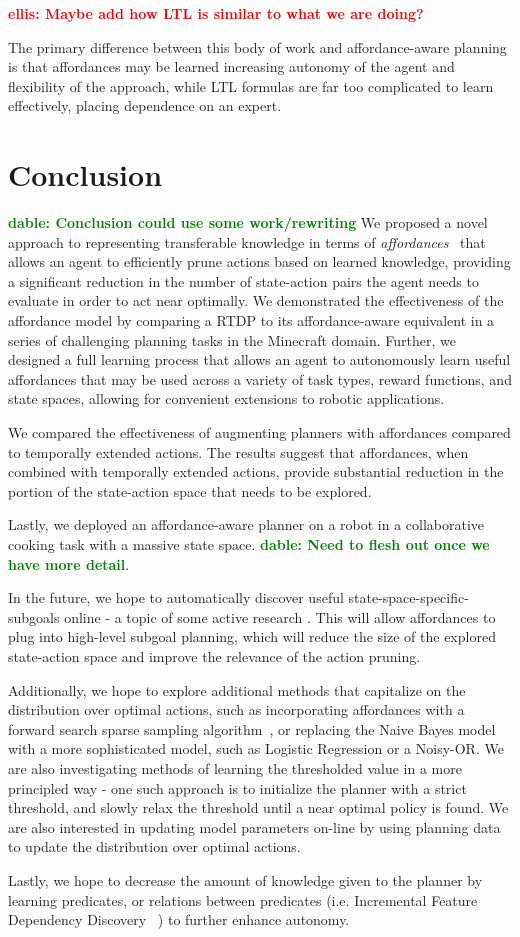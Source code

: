 \documentclass[letterpaper]{article}
\newcommand{\dnote}[1]{\textcolor{Green}{\textbf{dable:  #1}}}
\newcommand{\enote}[1]{\textcolor{Red}{\textbf{ellis:  #1}}}
\begin{document}
\enote{Maybe add how LTL is similar to what we are doing?}

The primary difference between this body of work and affordance-aware planning is that
affordances may be learned increasing autonomy of the agent and flexibility of the approach, while LTL formulas are far
too complicated to learn effectively, placing dependence on an expert.

\section{Conclusion}
\label{sec:conclusion}
\dnote{Conclusion could use some work/rewriting}
We proposed a novel approach to representing transferable knowledge in terms of
{\em affordances}~\cite{gibson77} that allows an agent to efficiently prune actions 
based on learned knowledge, providing a significant reduction in the number of state-action
pairs the agent needs to evaluate in order to act near optimally. We demonstrated the 
effectiveness of the affordance model by comparing a RTDP to its affordance-aware
equivalent in a series of challenging planning tasks in the Minecraft domain. Further, we designed
a full learning process that allows an agent to autonomously learn useful affordances that may be used
across a variety of task types, reward functions, and state spaces, allowing for convenient extensions 
to robotic applications.

We compared the effectiveness of augmenting planners with affordances compared to 
temporally extended actions. The results suggest that affordances, when combined with 
temporally extended actions, provide substantial reduction in the portion of the state-action 
space that needs to be explored.

Lastly, we deployed an affordance-aware planner on a robot in a collaborative cooking task with a massive 
state space. \dnote{Need to flesh out once we have more detail}.

In the future, we hope to automatically discover useful state-space-specific-subgoals online 
- a topic of some active research \cite{Mcgovern01automaticdiscovery,Simsek:2005:IUS:1102351.1102454}.
This will allow affordances to plug into high-level subgoal planning, which will reduce the size of the 
explored state-action space and improve the relevance of the action pruning. 

Additionally, we hope to explore additional methods that capitalize on the distribution over optimal actions,
such as incorporating affordances with a forward search sparse sampling algorithm~\cite{walsh2010integrating},
or replacing the Naive Bayes model with a more sophisticated model, such as Logistic Regression or a Noisy-OR.
We are also investigating methods of learning the thresholded value in a more principled way - one such
approach is to initialize the planner with a strict threshold, and slowly relax the threshold until a near optimal
policy is found. We are also interested in updating model parameters on-line by using planning data to update
the distribution over optimal actions. 

Lastly, we hope to decrease the amount of knowledge given to the planner by learning predicates, or relations between predicates (i.e. Incremental Feature Dependency Discovery ~\cite{ICML2011Geramifard_473}) to further enhance autonomy.

{\small


}
\end{document}
